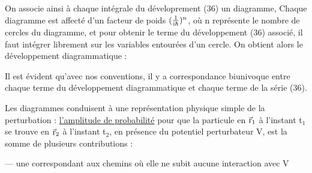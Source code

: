 On associe ainsi à chaque intégrale du déveloprement (36) un
diagramme, Chaque diagramme est affecté d'un facteur de poids $(\frac{1}{\text{i}\hbar})^n$, où n
représente le nombre de cercles du diagramme, et pour obtenir le terme du
développement (36) associé, il faut intégrer librement sur les variables
entourées d'un cercle. On obtient alors le développement diagrammatique :
\begin{flushright}
 \end{flushright}

Il est évident qu'avec nos conventions, il y a correspondance
biunivoque entre chaque terme du développement diagrammatique et chaque
terme de la série (36).

Les diagrammes conduisent à une représentation physique simple de
la perturbation : \ul{l'amplitude de probabilité} pour que la particule en $\vec{\text{r}}_1$
à l'instant t$_1$ se trouve en $\vec{\text{r}}_2$ à l'instant t$_2$, en présence du potentiel
perturbateur V, est la somme de plusieurs contributions :

— une correspondant aux chemins où elle ne subit aucune interaction avec V

